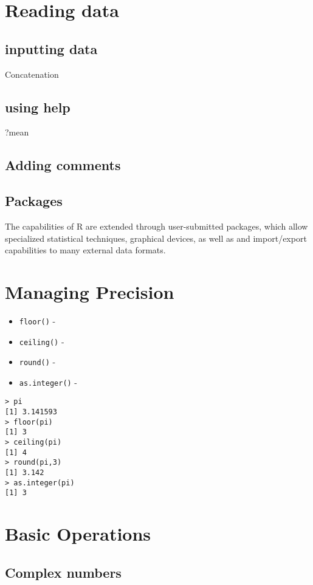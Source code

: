 \documentclass[a4paper,12pt]{article}
\begin{document}
\begin{itemize}
\section{Reading data}


\subsection{inputting data}
 Concatenation

\subsection{using help}

?mean

\subsection{Adding comments}

\subsection{Packages}
The capabilities of R are extended through user-submitted packages, which allow specialized statistical techniques, graphical devices, as well as and
import/export capabilities to many external data formats.

\section{Managing Precision}
\begin{itemize}
\item \texttt{floor()} - 
\item \texttt{ceiling()} - 
\item \texttt{round()} - 
\item \texttt{as.integer()} -
\end{itemize}

\begin{framed}
\begin{verbatim}
> pi
[1] 3.141593
> floor(pi)
[1] 3
> ceiling(pi)
[1] 4
> round(pi,3)
[1] 3.142
> as.integer(pi)
[1] 3
\end{verbatim}
\end{framed}

\section{Basic Operations}
\subsection{Complex numbers}

\end{itemize}
\end{document}
